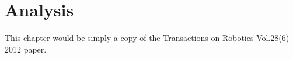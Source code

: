 \chapter{Analysis}\label{chap:analysis}


This chapter would be simply a copy of the Transactions on Robotics Vol.28(6) 2012 paper. 

